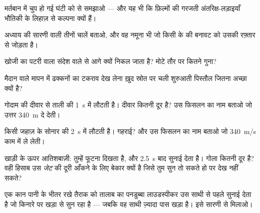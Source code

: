 \begin{exercise}[$\star$]\label{exo:g7:sound-production:3}
मर्तबान में चुप हो गई घंटी को  से समझाओ --- और यह भी कि फ़िल्मों
की गरजती अंतरिक्ष-लड़ाइयाँ भौतिकी के लिहाज़ से कल्पना क्यों हैं।
\end{exercise}

\begin{exercise}[$\star$]\label{exo:g7:sound-production:4}
अध्याय की सारणी वाली तीनों चालें बताओ, और वह नमूना भी जो किसी 
के  की बनावट को उसकी रफ़्तार से जोड़ता है।
\end{exercise}

\begin{exercise}[$\star$]\label{exo:g7:sound-production:5}
खोजी का पटरी वाला संदेश  वाले से आगे क्यों निकल जाता है? मोटे तौर
पर कितने गुना?
\end{exercise}

\begin{exercise}[$\star$]\label{exo:g7:sound-production:6}
मैदान वाले मापन में ढक्कनों का टकराव देख लेना ख़ुद स्रोत पर चली शुरुआती
पिस्तौल जितना अच्छा क्यों है?
\end{exercise}

\begin{exercise}[$\star$]\label{exo:g7:sound-production:7}
गोदाम की दीवार से ताली की  \qty{1}{s} में लौटती है। दीवार
कितनी दूर है? उस फिसलन का नाम बताओ जो उत्तर \qty{340}{m} दे देती।
\end{exercise}

\begin{exercise}[$\star$]\label{exo:g7:sound-production:8}
किसी जहाज़ के सोनार की  \qty{2}{s} में लौटती है। गहराई? और
उस फिसलन का नाम बताओ जो \qty{340}{m/s} काम में ले लेती।
\end{exercise}

\begin{exercise}[$\star\star$]\label{exo:g7:sound-production:9}
खाड़ी के ऊपर आतिशबाज़ी: तुम्हें फूटना दिखता है, और \qty{2.5}{s} बाद
सुनाई देता है। गोला कितनी दूर है? वही हिसाब उस \emph{जेट} की दूरी
आँकने के लिए बेकार क्यों है जिसे तुम सुन तो सकते हो पर देख नहीं सकते?
\end{exercise}

\begin{exercise}[$\star\star$]\label{exo:g7:sound-production:10}
एक कान पानी के भीतर रखे तैराक को तालाब का पनडुब्बा लाउडस्पीकर उस
साथी से पहले सुनाई देता है जो किनारे पर खड़ा  से सुन रहा है --- जबकि
वह साथी ज़्यादा पास खड़ा है। इसे सारणी से मिलाओ।
\end{exercise}

